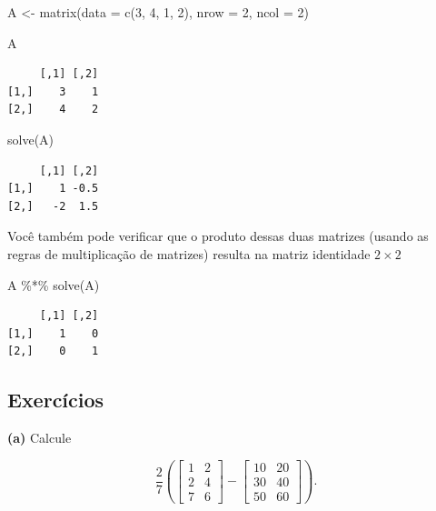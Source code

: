 \documentclass[
  letterpaper,
  DIV=11,
  numbers=noendperiod]{scrreprt}
\newenvironment{Shaded}{\begin{snugshade}}{\end{snugshade}}
\newcommand{\AttributeTok}[1]{\textcolor[rgb]{0.40,0.45,0.13}{#1}}
\newcommand{\DecValTok}[1]{\textcolor[rgb]{0.68,0.00,0.00}{#1}}
\newcommand{\FunctionTok}[1]{\textcolor[rgb]{0.28,0.35,0.67}{#1}}
\newcommand{\NormalTok}[1]{\textcolor[rgb]{0.00,0.23,0.31}{#1}}
\newcommand{\OtherTok}[1]{\textcolor[rgb]{0.00,0.23,0.31}{#1}}
\newcommand{\SpecialCharTok}[1]{\textcolor[rgb]{0.37,0.37,0.37}{#1}}
\begin{document}
\begin{Shaded}
\begin{Highlighting}[]
\NormalTok{A }\OtherTok{\textless{}{-}} \FunctionTok{matrix}\NormalTok{(}\AttributeTok{data =} \FunctionTok{c}\NormalTok{(}\DecValTok{3}\NormalTok{, }\DecValTok{4}\NormalTok{, }\DecValTok{1}\NormalTok{, }\DecValTok{2}\NormalTok{), }\AttributeTok{nrow =} \DecValTok{2}\NormalTok{, }\AttributeTok{ncol =} \DecValTok{2}\NormalTok{)}

\NormalTok{A}
\end{Highlighting}
\end{Shaded}

\begin{verbatim}
     [,1] [,2]
[1,]    3    1
[2,]    4    2
\end{verbatim}

\begin{Shaded}
\begin{Highlighting}[]
\FunctionTok{solve}\NormalTok{(A)}
\end{Highlighting}
\end{Shaded}

\begin{verbatim}
     [,1] [,2]
[1,]    1 -0.5
[2,]   -2  1.5
\end{verbatim}

Você também pode verificar que o produto dessas duas matrizes (usando as
regras de multiplicação de matrizes) resulta na matriz identidade
\(2 \times 2\)

\begin{Shaded}
\begin{Highlighting}[]
\NormalTok{A }\SpecialCharTok{\%*\%} \FunctionTok{solve}\NormalTok{(A)}
\end{Highlighting}
\end{Shaded}

\begin{verbatim}
     [,1] [,2]
[1,]    1    0
[2,]    0    1
\end{verbatim}

\subsection*{Exercícios}\label{exercuxedcios-2}

\textbf{(a)} Calcule

\[
\frac{2}{7}\left(
\begin{bmatrix}1 & 2\\2 & 4 \\ 7 & 6\end{bmatrix}
-
\begin{bmatrix}10 & 20\\30 & 40 \\ 50 & 60\end{bmatrix}
\right).
\]
\end{document}
